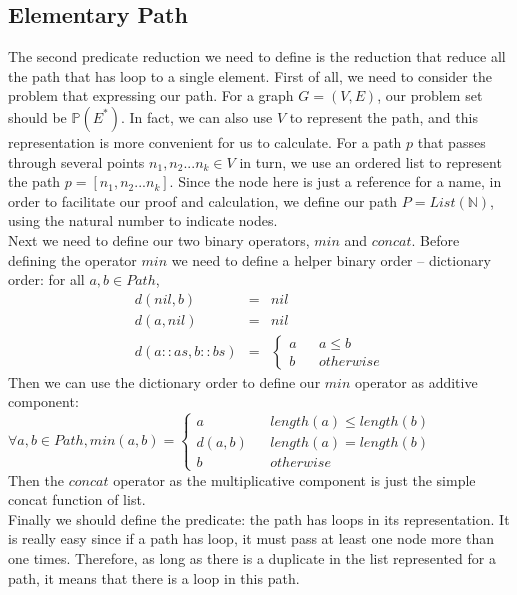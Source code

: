 \documentclass[a4paper,10pt]{article}
\begin{document}
\subsection{Elementary Path}
The second predicate reduction we need to define is the reduction that reduce all the path that has loop to a single element. First of all, we need to consider the problem that expressing our path. For a graph $G = (V,E)$, our problem set should be $\mathbb{P}(E^*)$. In fact, we can also use $V$ to represent the path, and this representation is more convenient for us to calculate. For a path $p$ that passes through several points $n_1,n_2 ... n_k \in V$ in turn, we use an ordered list to represent the path $p = [n_1,n_2 ... n_k]$. 
Since the node here is just a reference for a name, in order to facilitate our proof and calculation, we define our path $P = List(\mathbb{N})$, using the natural number to indicate nodes.\\
Next we need to define our two binary operators, $min$ and $concat$. 
Before defining the operator $min$ we need to define a helper binary order -- dictionary order: for all  $a,b \in Path$,
\[
\begin{array}{rcl} 
d(nil,b) & = & nil\\
d(a,nil) & = & nil\\
d(a::as,b::bs) & = & 
\left\{
\begin{aligned}
a &  & a \leq b \\
b &  & otherwise
\end{aligned}
\right.
\end{array}
\] 
Then we can use the dictionary order to define our $min$ operator as additive component: \\
$\forall a,b \in Path, min(a,b) = \left\{
\begin{aligned}
a &  & length(a) \leq length(b) \\
d(a,b) &  & length(a) = length(b) \\
b &  & otherwise 
\end{aligned}
\right.$\\
Then the $concat$ operator as the multiplicative component is just the simple concat function of list.\\
Finally we should define the predicate: the path has loops in its representation. It is really easy since if a path has loop, it must pass at least one node more than one times. 
Therefore, as long as there is a duplicate in the list represented for a path, it means that there is a loop in this path.\\
\end{document}
